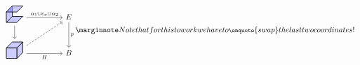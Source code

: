 \[
\begin{tikzcd}[column sep = huge]
\begin{tikzpicture}[x = 1.4em, y = 1.4em, z = 0.8em, baseline = 0.4em]
    \begin{scope}[fill=blue, opacity=0.2]
    \fill
    (0,0,0) -- (0,1,0) -- (0,1,1) -- (0,0,1) -- (0,0,0);
    \fill
    (0,0,0) -- (1,0,0) -- (1,0,1) -- (0,0,1) -- (0,0,0);
    \fill
    (0,1,0) -- (1,1,0) -- (1,1,1) -- (0,1,1) -- (0,1,0);
    \end{scope}
    \begin{scope}[thick]
    \draw[black!60]
    (0,0.4,1) -- (0,1,1);
    \draw
    (0,0,1) -- (0,0.45,1)
    (0,0,0) -- (0,1,0)
    (0,0,0) -- (1,0,0) -- (1,0,1) -- (0,0,1) -- (0,0,0)
    (0,1,0) -- (1,1,0) -- (1,1,1) -- (0,1,1) -- (0,1,0);
    \end{scope}
\end{tikzpicture}
\ar[r, "\alpha_1\cup c_x\cup\alpha_2"] \ar[d] & E \ar[d, " p"]\\
\begin{tikzpicture}[x = 1.4em, y = 1.4em, z = 0.8em, baseline = 0.4em]
    \begin{scope}[fill=blue!20, thick]
    \filldraw
    (1,0,0) -- (1,1,0) -- (1,1,1) -- (1,0,1) -- (1,0,0);
    \filldraw
    (1,0,0) -- (1,1,0) -- (0,1,0) -- (0,0,0) -- (1,0,0);
    \filldraw
    (0,1,0) -- (1,1,0) -- (1,1,1) -- (0,1,1) -- (0,1,0);
    \end{scope}
\end{tikzpicture}
\ar[r, "H"'] \ar[ur, dashed] & B
\end{tikzcd}\rightnote{Note that for this to work we have to \enquote{swap} the last two coordinates!}
\]